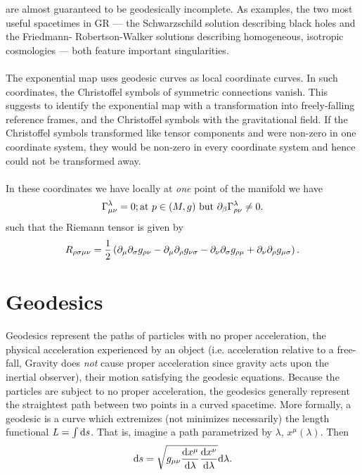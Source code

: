 are almost guaranteed to be geodesically incomplete. As examples, the two most useful
spacetimes in GR — the Schwarzschild solution describing black holes and the Friedmann-
Robertson-Walker solutions describing homogeneous, isotropic cosmologies — both feature
important singularities.
\\
\\
The exponential map uses geodesic curves as local coordinate curves. In such coordinates, the
Christoffel symbols of symmetric connections vanish. This suggests to identify the exponential
map with a transformation into freely-falling reference frames, and the Christoffel symbols with
the gravitational field. If the Christoffel symbols transformed like tensor components and were
non-zero in one coordinate system, they would be non-zero in every coordinate system and
hence could not be transformed away.
\\ 
\\
In these coordinates we have locally at \emph{one} point of the manifold we have
\begin{equation}
	\Gamma^\lambda_{\mu \nu}=0; \text{at } p\in (M,g) \text{ but } \partial_\beta\Gamma^\lambda_{\rho \nu} \neq 0.
\end{equation}
such that the Riemann tensor is given by
\begin{equation}
	R_{\rho \sigma \mu \nu} = \frac{1}{2}\left(\partial_\mu \partial_\sigma g_{\rho \nu} - \partial_\mu \partial_\rho g_{\nu\sigma} - \partial_\nu \partial_\sigma g_{\rho \mu} + \partial_\nu \partial_\rho g_{\mu \sigma}\right).
\end{equation}








\section{Geodesics}
Geodesics represent the paths of particles with no proper acceleration, the physical acceleration experienced by an object (i.e. acceleration relative to a free-fall, Gravity does \emph{not} cause proper acceleration since gravity acts upon the inertial observer), their motion satisfying the geodesic equations. Because the particles are subject to no proper acceleration, the geodesics generally represent the straightest path between two points in a curved spacetime.
More formally, a geodesic is a curve which extremizes (not minimizes necessarily) the length functional $L=\int \mathrm{d} s$. That is, imagine a path parametrized by $\lambda$, $x^{\mu} (\lambda)$. Then
\begin{equation}
	\mathrm{d} s = \sqrt{g_{\mu \nu} \frac{\mathrm{d} x^{\mu}}{\mathrm{d} \lambda} \frac{\mathrm{d} x^{\nu}}{\mathrm{d} \lambda}} \mathrm{d} \lambda.
\end{equation}

